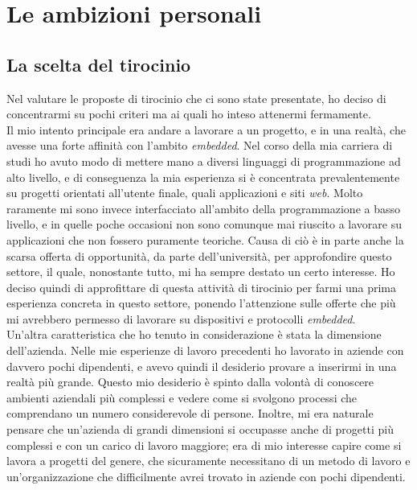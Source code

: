 \section{Le ambizioni personali}
\subsection{La scelta del tirocinio}
\noindent
Nel valutare le proposte di tirocinio che ci sono state presentate, ho deciso di concentrarmi su pochi criteri ma ai quali ho inteso attenermi fermamente.\\

\noindent
Il mio intento principale era andare a lavorare a un progetto, e in una realtà, che avesse una forte affinità con l'ambito \textit{embedded}.
Nel corso della mia carriera di studi ho avuto modo di mettere mano a diversi linguaggi di programmazione ad alto livello, e di conseguenza la mia esperienza si è concentrata prevalentemente su progetti orientati all'utente finale, quali applicazioni e siti \textit{web}.
Molto raramente mi sono invece interfacciato all'ambito della programmazione a basso livello, e in quelle poche occasioni non sono comunque mai riuscito a lavorare su applicazioni che non fossero puramente teoriche.
Causa di ciò è in parte anche la scarsa offerta di opportunità, da parte dell'università, per approfondire questo settore, il quale, nonostante tutto, mi ha sempre destato un certo interesse.
Ho deciso quindi di approfittare di questa attività di tirocinio per farmi una prima esperienza concreta in questo settore, ponendo l'attenzione sulle offerte che più mi avrebbero permesso di lavorare su dispositivi e protocolli \textit{embedded}.\\

\noindent
Un'altra caratteristica che ho tenuto in considerazione è stata la dimensione dell'azienda.
Nelle mie esperienze di lavoro precedenti ho lavorato in aziende con davvero pochi dipendenti, e avevo quindi il desiderio provare a inserirmi in una realtà più grande.
Questo mio desiderio è spinto dalla volontà di conoscere ambienti aziendali più complessi e vedere come si svolgono processi che comprendano un numero considerevole di persone.
Inoltre, mi era naturale pensare che un'azienda di grandi dimensioni si occupasse anche di progetti più complessi e con un carico di lavoro maggiore; era di mio interesse capire come si lavora a progetti del genere, che sicuramente necessitano di un metodo di lavoro e un'organizzazione che difficilmente avrei trovato in aziende con pochi dipendenti.

